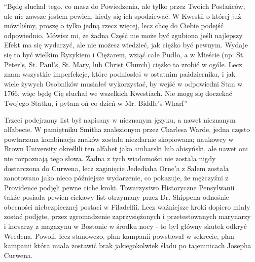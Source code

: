 \begin{displayquote}

``Będę słuchał tego, co masz do Powiedzenia, ale tylko przez Twoich Posłańców, ale nie zawsze jestem pewien, kiedy się ich spodziewać. W Kwestii o której już mówiliśmy, proszę o tylko jedną rzecz więcej, lecz chcę do Ciebie podejść odpowiednio. Mówisz mi, że żadna Część nie może być zgubiona jeśli najlepszy Efekt ma się wydarzyć, ale nie możesz wiedzieć, jak ciężko być pewnym. Wydaje się to być wielkim Ryzykiem i Ciężarem, wziąć całe Pudło, a w Mieście (np: St. Peter's, St. Paul's, St. Mary, lub Christ Church) ciężko to zrobić w ogóle. Lecz znam wszystkie imperfekcje, które podniosłeś w ostatnim październiku, i jak wiele żywych Osobników musiałeś wykorzystać, by wejść w odpowiedni Stan w 1766, więc będę Cię słuchał we wszelkich Kwestiach. Nie mogę się doczekać Twojego Statku, i pytam oń co dzień w Mr. Biddle's Wharf''

\end{displayquote}

Trzeci podejrzany list był napisany w nieznanym języku, a nawet nieznanym alfabecie. W pamiętniku Smitha znalezionym przez Charlesa Warde, jedna często powtarzana kombinacja znaków została niezdarnie skopiowana; naukowcy w Brown University określili ten alfabet jako amharski lub abisyński, ale nawet oni nie rozpoznają tego słowa. Żadna z tych wiadomości nie została nigdy dostarczona do Curwena, lecz zaginięcie Jedediaha Orne'a z Salem została zanotowano jako nieco późniejsze wydarzenie, co pokazuje, że mężczyźni z Providence podjęli pewne ciche kroki. Towarzystwo Historyczne Pensylwanii także posiada pewien ciekawy list otrzymany przez Dr. Shippena odnośnie obecności niebezpiecznej postaci w Filadelfii.
Lecz ważniejsze kroki dopiero miały zostać podjęte, przez zgromadzenie zaprzysiężonych i przetestowanych marynarzy i korsarzy z magazynu w Bostonie w środku nocy - to był główny skutek odkryć Weedena. Powoli, lecz stanowczo, plan kampanii powstawał w sekrecie, plan kampanii która miała zostawić brak jakiegokolwiek śladu po tajemnicach Josepha Curwena. 

